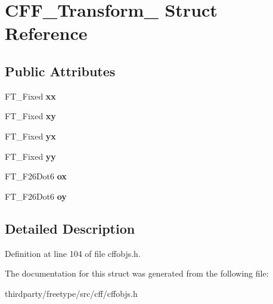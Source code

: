 \hypertarget{struct_c_f_f___transform__}{}\section{C\+F\+F\+\_\+\+Transform\+\_\+ Struct Reference}
\label{struct_c_f_f___transform__}
\subsection*{Public Attributes}
\begin{DoxyCompactItemize}
\item 
\mbox{\label{struct_c_f_f___transform___ab298a077bcdb766295e143b75a804d56}} 
F\+T\+\_\+\+Fixed {\bfseries xx}
\item 
\mbox{\label{struct_c_f_f___transform___a416f86bda38e8419c3cc257318428527}} 
F\+T\+\_\+\+Fixed {\bfseries xy}
\item 
\mbox{\label{struct_c_f_f___transform___af31ed561987e0d591fa1b9cc07223c34}} 
F\+T\+\_\+\+Fixed {\bfseries yx}
\item 
\mbox{\label{struct_c_f_f___transform___a43b2ee1db7f2491becdceba5ea83d396}} 
F\+T\+\_\+\+Fixed {\bfseries yy}
\item 
\mbox{\label{struct_c_f_f___transform___ac818ee3d460b871aff4224eea40b7144}} 
F\+T\+\_\+\+F26\+Dot6 {\bfseries ox}
\item 
\mbox{\label{struct_c_f_f___transform___a5600d25e4fc3bb6385f0d67a15ac41cd}} 
F\+T\+\_\+\+F26\+Dot6 {\bfseries oy}
\end{DoxyCompactItemize}


\subsection{Detailed Description}


Definition at line 104 of file cffobjs.\+h.



The documentation for this struct was generated from the following file\+:\begin{DoxyCompactItemize}
\item 
thirdparty/freetype/src/cff/cffobjs.\+h\end{DoxyCompactItemize}
